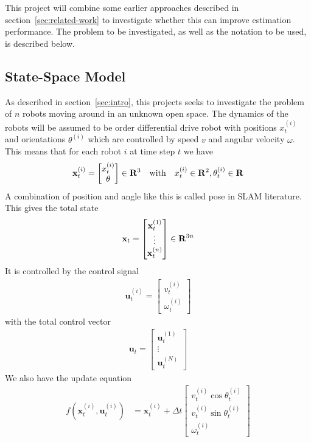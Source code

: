 This project will combine some earlier approaches described in section~\ref{sec:related-work} to investigate whether this can improve estimation performance. The problem to be investigated, as well as the notation to be used, is described below.

\subsection{State-Space Model}
As described in section~\ref{sec:intro}, this projects seeks to investigate the problem of $n$ robots moving around in an unknown open space. The dynamics of the robots will be assumed to be  order differential drive robot with positions $x^{(i)}_t$ and orientations $\theta^{(i)}$ which are  controlled by speed $v$ and angular velocity $\omega$. This means that for each robot $i$ at time step $t$ we have 
\begin{align}
    \state = \begin{bmatrix}
        \x \\ \theta
    \end{bmatrix}
    \in \R{3} \quad \text{with} \quad \x \in \R{2}, \thet \in \R{}
\end{align}
A combination of position and angle like this is called pose in SLAM literature. This gives the total state
\begin{align}
    \mathbf{x}_t = \begin{bmatrix}
        \state[1] \\ \vdots \\ \state[n] 
    \end{bmatrix}
    \in \R{3n}
\end{align}
It is controlled by the control signal 
\begin{align}
    \mathbf{u}_t^{(i)} = \begin{bmatrix}
        v_t^{(i)} \\ \omega _t^{(i)}
    \end{bmatrix}
\end{align}
with the total control vector 
\begin{align}
    \mathbf{u}_t = \begin{bmatrix}
        \mathbf{u}_t^{(1)} \\ \vdots \\ \mathbf{u}_t^{(N)}
    \end{bmatrix}
\end{align}
We also have the update equation
\begin{align}
    f(\mathbf{x}_t^{(i)}, \mathbf{u}_t^{(i)}) &= \mathbf{x}_t^{(i)} + \Delta t
    \begin{bmatrix} 
        v_t^{(i)} \cos \theta_t^{(i)} \\ v_t^{(i)} \sin \theta_t^{(i)} \\ \omega_t^{(i)}
    \end{bmatrix}
\end{align}

